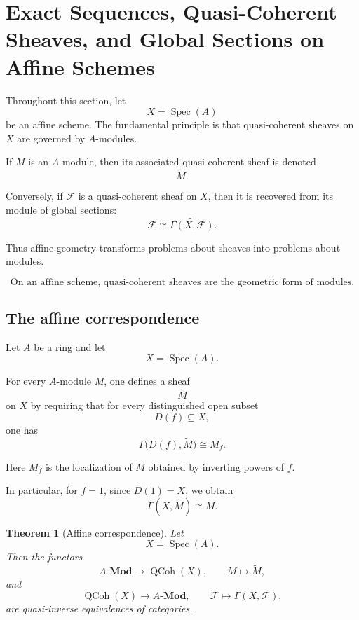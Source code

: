 \documentclass[12pt,a4paper]{article}
\newtheorem{theorem}{Theorem}[section]
\theoremstyle{notespace}
\begin{document}
\section{Exact Sequences, Quasi-Coherent Sheaves, and Global Sections on Affine Schemes}
\label{sec:exact-qcoh-affine-global-sections}

Throughout this section, let
\[
X=\operatorname{Spec}(A)
\]
be an affine scheme. The fundamental principle is that quasi-coherent sheaves
on \(X\) are governed by \(A\)-modules.

If \(M\) is an \(A\)-module, then its associated quasi-coherent sheaf is
denoted
\[
\widetilde{M}.
\]

Conversely, if \(\mathcal{F}\) is a quasi-coherent sheaf on \(X\), then it is
recovered from its module of global sections:
\[
\mathcal{F}
\cong
\widetilde{\Gamma(X,\mathcal{F})}.
\]

Thus affine geometry transforms problems about sheaves into problems about
modules.

\[
\boxed{
	\text{On an affine scheme, quasi-coherent sheaves are the geometric form of modules.}
}
\]

\subsection{The affine correspondence}

Let \(A\) be a ring and let
\[
X=\operatorname{Spec}(A).
\]

For every \(A\)-module \(M\), one defines a sheaf
\[
\widetilde{M}
\]
on \(X\) by requiring that for every distinguished open subset
\[
D(f)\subseteq X,
\]
one has
\[
\Gamma\bigl(D(f),\widetilde{M}\bigr)
\cong
M_{f}.
\]

Here \(M_{f}\) is the localization of \(M\) obtained by inverting powers of
\(f\).

In particular, for \(f=1\), since \(D(1)=X\), we obtain
\[
\Gamma(X,\widetilde{M})
\cong
M.
\]

\begin{theorem}[Affine correspondence]
	Let
	\[
	X=\operatorname{Spec}(A).
	\]
	Then the functors
	\[
	A\text{-}\mathbf{Mod}
	\longrightarrow
	\operatorname{QCoh}(X),
	\qquad
	M\longmapsto \widetilde{M},
	\]
	and
	\[
	\operatorname{QCoh}(X)
	\longrightarrow
	A\text{-}\mathbf{Mod},
	\qquad
	\mathcal{F}\longmapsto \Gamma(X,\mathcal{F}),
	\]
	are quasi-inverse equivalences of categories.
\end{theorem}
\end{document}
